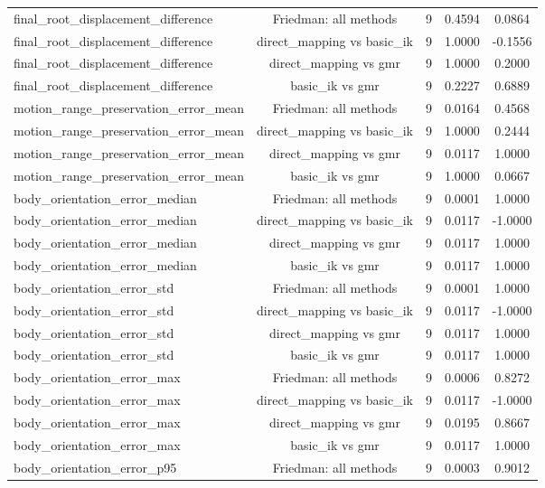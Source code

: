 \begin{table}[t]
{\begin{tabular}{lcccc}
final\_root\_displacement\_difference & Friedman: all methods & 9 & 0.4594 & 0.0864 \\
final\_root\_displacement\_difference & direct\_mapping vs basic\_ik & 9 & 1.0000 & -0.1556 \\
final\_root\_displacement\_difference & direct\_mapping vs gmr & 9 & 1.0000 & 0.2000 \\
final\_root\_displacement\_difference & basic\_ik vs gmr & 9 & 0.2227 & 0.6889 \\
motion\_range\_preservation\_error\_mean & Friedman: all methods & 9 & 0.0164 & 0.4568 \\
motion\_range\_preservation\_error\_mean & direct\_mapping vs basic\_ik & 9 & 1.0000 & 0.2444 \\
motion\_range\_preservation\_error\_mean & direct\_mapping vs gmr & 9 & 0.0117 & 1.0000 \\
motion\_range\_preservation\_error\_mean & basic\_ik vs gmr & 9 & 1.0000 & 0.0667 \\
body\_orientation\_error\_median & Friedman: all methods & 9 & 0.0001 & 1.0000 \\
body\_orientation\_error\_median & direct\_mapping vs basic\_ik & 9 & 0.0117 & -1.0000 \\
body\_orientation\_error\_median & direct\_mapping vs gmr & 9 & 0.0117 & 1.0000 \\
body\_orientation\_error\_median & basic\_ik vs gmr & 9 & 0.0117 & 1.0000 \\
body\_orientation\_error\_std & Friedman: all methods & 9 & 0.0001 & 1.0000 \\
body\_orientation\_error\_std & direct\_mapping vs basic\_ik & 9 & 0.0117 & -1.0000 \\
body\_orientation\_error\_std & direct\_mapping vs gmr & 9 & 0.0117 & 1.0000 \\
body\_orientation\_error\_std & basic\_ik vs gmr & 9 & 0.0117 & 1.0000 \\
body\_orientation\_error\_max & Friedman: all methods & 9 & 0.0006 & 0.8272 \\
body\_orientation\_error\_max & direct\_mapping vs basic\_ik & 9 & 0.0117 & -1.0000 \\
body\_orientation\_error\_max & direct\_mapping vs gmr & 9 & 0.0195 & 0.8667 \\
body\_orientation\_error\_max & basic\_ik vs gmr & 9 & 0.0117 & 1.0000 \\
body\_orientation\_error\_p95 & Friedman: all methods & 9 & 0.0003 & 0.9012 \\

\end{tabular}}
\end{table}
